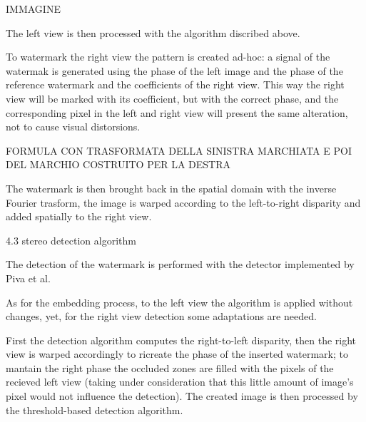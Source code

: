 IMMAGINE

The left view is then processed with the algorithm discribed above.

To watermark the right view the pattern is created ad-hoc: a signal of the watermak is generated using the phase of the left image and the phase of the reference watermark and 
the coefficients of the right view.  
This way the right view will be marked with its coefficient, but with the correct phase, and the corresponding pixel in the left and right view will present the same alteration, not to cause visual distorsions.

FORMULA CON TRASFORMATA DELLA SINISTRA MARCHIATA E POI DEL MARCHIO COSTRUITO PER LA DESTRA

The watermark is then brought back in the spatial domain with the inverse Fourier trasform, the image is warped according to the left-to-right disparity and added spatially to the right view.


4.3 stereo detection algorithm

The detection of the watermark is performed with the detector implemented by Piva et al.

As for the embedding process, to the left view the algorithm is applied without changes, yet, for the right view detection some adaptations are needed.

First the detection algorithm computes the right-to-left disparity, then the right view is warped accordingly to ricreate the phase of the inserted watermark; to mantain the right phase the occluded zones are filled with the pixels of the recieved left view (taking under consideration that this little amount of image's pixel would not influence the detection).
The created image is then processed by the threshold-based detection algorithm. 




